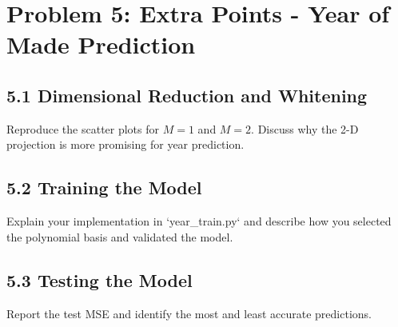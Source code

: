 \documentclass[12pt]{article}
\begin{document}
\section*{Problem 5: Extra Points - Year of Made Prediction}

\subsection*{5.1 Dimensional Reduction and Whitening}
Reproduce the scatter plots for \( M = 1 \) and \( M = 2 \). Discuss why the 2-D projection is more promising for year prediction.

\subsection*{5.2 Training the Model}
Explain your implementation in `year\_train.py` and describe how you selected the polynomial basis and validated the model.

\subsection*{5.3 Testing the Model}
Report the test MSE and identify the most and least accurate predictions.
\end{document}

